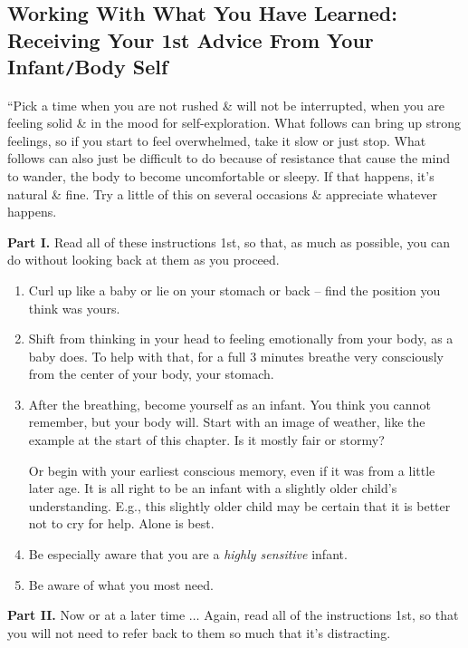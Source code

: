 \documentclass{article}
\numberwithin{equation}{section}
\begin{document}
\subsection{Working With What You Have Learned: Receiving Your 1st Advice From Your Infant{\tt/}Body Self}
``Pick a time when you are not rushed \& will not be interrupted, when you are feeling solid \& in the mood for self-exploration. What follows can bring up strong feelings, so if you start to feel overwhelmed, take it slow or just stop. What follows can also just be difficult to do because of resistance that cause the mind to wander, the body to become uncomfortable or sleepy. If that happens, it's natural \& fine. Try a little of this on several occasions \& appreciate whatever happens.

\noindent\textbf{Part I.} Read all of these instructions 1st, so that, as much as possible, you can do without looking back at them as you proceed.
\begin{enumerate}
	\item Curl up like a baby or lie on your stomach or back -- find the position you think was yours.
	\item Shift from thinking in your head to feeling emotionally from your body, as a baby does. To help with that, for a full 3 minutes breathe very consciously from the center of your body, your stomach.
	\item After the breathing, become yourself as an infant. You think you cannot remember, but your body will. Start with an image of weather, like the example at the start of this chapter. Is it mostly fair or stormy?
	
	Or begin with your earliest conscious memory, even if it was from a little later age. It is all right to be an infant with a slightly older child's understanding. E.g., this slightly older child may be certain that it is better not to cry for help. Alone is best.
	\item Be especially aware that you are a \textit{highly sensitive} infant.
	\item Be aware of what you most need.
\end{enumerate}
\textbf{Part II.} Now or at a later time $\ldots$ Again, read all of the instructions 1st, so that you will not need to refer back to them so much that it's distracting.
\end{document}
